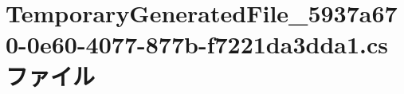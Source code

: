 \hypertarget{TemporaryGeneratedFile__5937a670-0e60-4077-877b-f7221da3dda1_8cs}{}\section{Temporary\+Generated\+File\+\_\+5937a670-\/0e60-\/4077-\/877b-\/f7221da3dda1.cs ファイル}
\label{TemporaryGeneratedFile__5937a670-0e60-4077-877b-f7221da3dda1_8cs}

